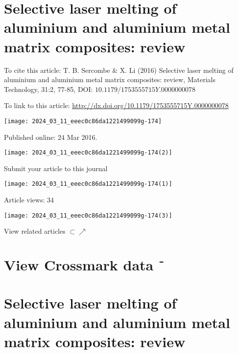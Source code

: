 \documentclass[10pt]{article}
\begin{document}
\section*{Selective laser melting of aluminium and aluminium metal matrix composites: review }
To cite this article: T. B. Sercombe \& X. Li (2016) Selective laser melting of aluminium and aluminium metal matrix composites: review, Materials Technology, 31:2, 77-85, DOI: $10.1179 / 1753555715 Y .0000000078$

To link to this article: \href{http://dx.doi.org/10.1179/1753555715Y.0000000078}{http://dx.doi.org/10.1179/1753555715Y.0000000078}

\begin{center}
\texttt{[image: 2024\_03\_11\_eeec0c86da1221499099g-174]}
\end{center}

Published online: 24 Mar 2016.

\begin{center}
\texttt{[image: 2024\_03\_11\_eeec0c86da1221499099g-174(2)]}
\end{center}

Submit your article to this journal

\begin{center}
\texttt{[image: 2024\_03\_11\_eeec0c86da1221499099g-174(1)]}
\end{center}

Article views: 34

\begin{center}
\texttt{[image: 2024\_03\_11\_eeec0c86da1221499099g-174(3)]}
\end{center}

View related articles $\subset \nearrow$

\section*{View Crossmark data $־$}
\section*{Selective laser melting of aluminium and aluminium metal matrix composites: review}
\end{document}
